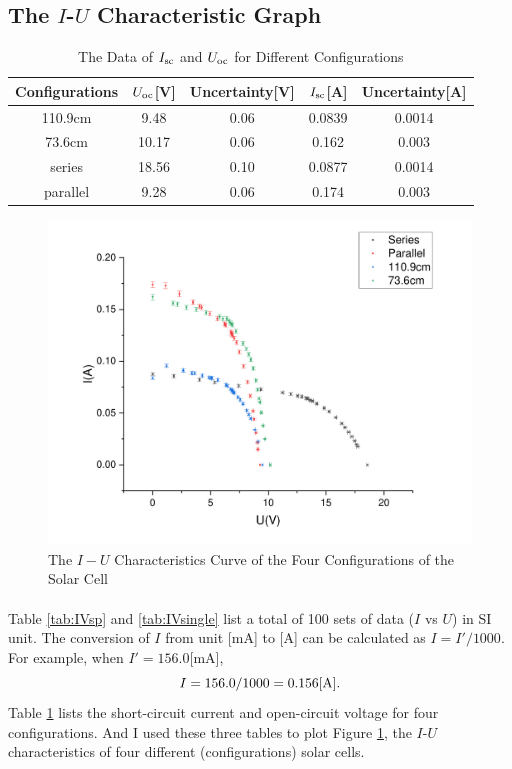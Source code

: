 \documentclass[a4paper]{article}
\begin{document}
    \subsection{The $I$-$U$ Characteristic Graph}
    \begin{table}[!ht]
        \centering
        \begin{tabular}{|c|c|c|c|c|}
            \hline
            Configurations&$U_{\rm oc}$[V]&Uncertainty[V]&$I_{\rm sc}$[A]&Uncertainty[A]\\\hline
            110.9cm&9.48&0.06&0.0839&0.0014\\\hline
            73.6cm&10.17&0.06&0.162&0.003\\\hline
            series&18.56&0.10&0.0877&0.0014\\\hline
            parallel&9.28&0.06&0.174&0.003\\\hline
        \end{tabular}
        \caption{The Data of $I_{\rm sc}$ and $U_{\rm oc}$ for Different Configurations}
        \label{tab:IVscoc}
    \end{table}
    \begin{figure}[!ht]
        \centering
        \includegraphics[width=\textwidth]{fig/IvsV.pdf}
        \caption{The $I-U$ Characteristics Curve of the Four Configurations of the Solar Cell}
        \label{fig:IvsV}
    \end{figure}
    \paragraph{} Table \ref{tab:IVsp} and \ref{tab:IVsingle} list a total of 100 sets of data ($I$ vs $U$) in SI unit. The conversion of $I$ from unit [mA] to [A] can be calculated as $I=I'/1000$. For example, when $I'=156.0$[mA], $$I=156.0/1000=0.156[\rm A].$$ Table \ref{tab:IVscoc} lists the short-circuit current and open-circuit voltage for four configurations. And I used these three tables to plot Figure \ref{fig:IvsV}, the $I$-$U$ characteristics of four different (configurations) solar cells.
\end{document}
